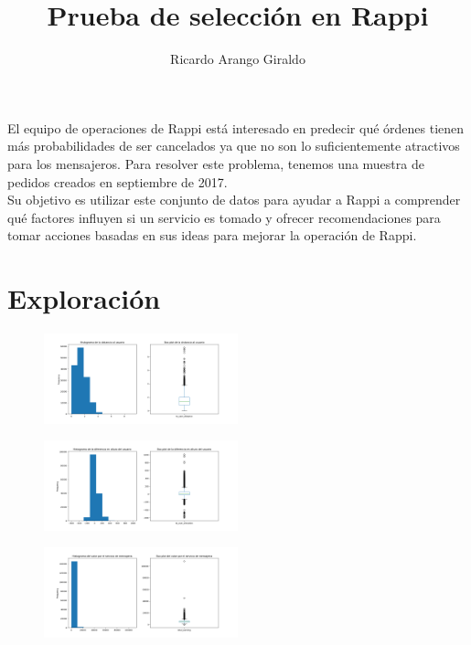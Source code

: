 \documentclass[10pt,a4paper]{article}
\author{Ricardo Arango Giraldo}
\title{Prueba de selección en Rappi}
\begin{document}
\maketitle
	El equipo de operaciones de Rappi está interesado en predecir qué órdenes tienen más probabilidades de ser cancelados ya que no son lo suficientemente atractivos para los mensajeros. Para resolver este problema, tenemos una muestra de pedidos creados en septiembre de 2017.\\
	Su objetivo es utilizar este conjunto de datos para ayudar a Rappi a comprender qué factores influyen si un servicio es tomado y ofrecer recomendaciones para tomar acciones basadas en sus ideas para mejorar la operación de Rappi.
	\section{Exploración}
		\begin{figure}[h]
			\centering
			\includegraphics[width=0.5\textwidth]{../Img/to_user_distance}
		\end{figure}
	
		\begin{figure}[h]
			\centering
			\includegraphics[width=0.5\textwidth]{../Img/to_user_elevation}
		\end{figure}
	
		\begin{figure}[h]
			\centering
			\includegraphics[width=0.5\textwidth]{../Img/total_earning}
		\end{figure}
\end{document}
